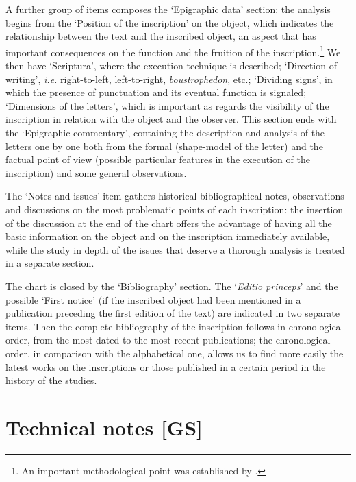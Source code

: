 \documentclass[amsthm,ebook]{saparticle}
\begin{document}
A further group of items composes the ‘Epigraphic data' section: the analysis begins from the ‘Position of the
inscription' on the object, which indicates the relationship between the text and the inscribed object, an aspect that
has important consequences on the function and the fruition of the inscription.\footnote{An important methodological
point was established by \citet{susini_epigrafia_1982}.} We then have ‘Scriptura', where the execution technique is described;
‘Direction of writing', \emph{i.e.} right-to-left, left-to-right, \emph{boustrophedon}, etc.; ‘Dividing signs', in which the presence
of punctuation and its eventual function is signaled; ‘Dimensions of the letters', which is important as regards the
visibility of the inscription in relation with the object and the observer. This section ends with the ‘Epigraphic
commentary', containing the description and analysis of the letters one by one both from the formal (shape-model of the
letter) and the factual point of view (possible particular features in the execution of the inscription) and some
general observations.

The ‘Notes and issues' item gathers historical-bibliographical notes, observations and discussions on the most
problematic points of each inscription: the insertion of the discussion at the end of the chart offers the advantage of
having all the basic information on the object and on the inscription immediately available, while the study in depth
of the issues that deserve a thorough analysis is treated in a separate section. 

The chart is closed by the ‘Bibliography' section. The ‘\emph{Editio princeps}' and the possible ‘First notice' (if the
inscribed object had been mentioned in a publication preceding the first edition of the text) are indicated in two
separate items. Then the complete bibliography of the inscription follows in chronological order, from the most dated
to the most recent publications; the chronological order, in comparison with the alphabetical one, allows us to find
more easily the latest works on the inscriptions or those published in a certain period in the history of the studies. 

\section{Technical notes [GS]}\label{sec:4tech}
\end{document}
